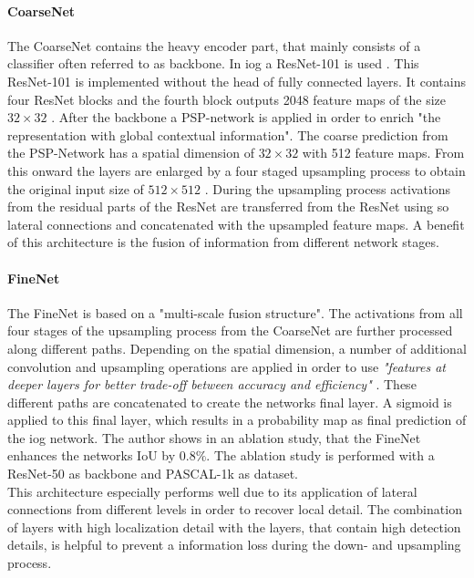 \paragraph{CoarseNet}
The CoarseNet contains the heavy encoder part, that mainly consists of a classifier often referred to as backbone. In \gls{iog} a ResNet-101 \cite{He16-ResNet} is used .
This ResNet-101 is implemented without the head of fully connected layers. It contains four ResNet blocks and the fourth block outputs 2048 feature maps of the size $32 \times 32$ .
After the backbone a PSP-network is applied in order to enrich "the representation with global contextual information"\cite{Zha20-IOG}.
The coarse prediction from the PSP-Network \cite{Zhao17-PSP} has a spatial dimension of  $32 \times 32$  with 512 feature maps. 
From this onward the layers are enlarged by a four staged upsampling process to obtain the original input size of  $512 \times 512$ . 
During the upsampling process activations from the residual parts of the ResNet are transferred from the ResNet using so lateral connections and concatenated with the upsampled feature maps.
A benefit of this architecture is the fusion of information from different network stages.

\paragraph{FineNet}
The FineNet is based on a "multi-scale fusion structure"\cite{Zha20-IOG}. 
The activations from all four stages of the upsampling process from the CoarseNet are further processed along different paths. 
Depending on the spatial dimension, a number of additional convolution and upsampling operations are applied in order to use \emph{"features at deeper layers for better trade-off between accuracy and efficiency"} \cite[p. 12237]{Zha20-IOG}.
These different paths are concatenated to create the networks final layer.
A sigmoid is applied to this final layer, which results in a probability map as final prediction of the \gls{iog} network.
The author shows in an ablation study, that the FineNet enhances the networks IoU by $0.8\%$. 
The ablation study is performed with a ResNet-50 as backbone and PASCAL-1k \cite{Eve20-PascalVOC} as dataset. 
\\
This architecture especially performs well due to its application of lateral connections from different levels in order to recover local detail.
The combination of layers with high localization detail with the layers, that contain high detection details, is helpful to prevent a information loss during the down- and upsampling process.

